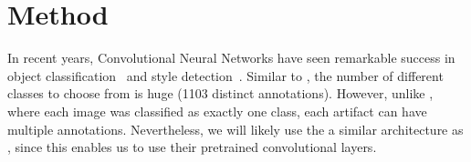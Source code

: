 \section{Method}
In recent years, Convolutional Neural Networks have seen remarkable success in object classification~\cite{alexnet} and style detection~\cite{style}.
Similar to \citet{alexnet}, the number of different classes to choose from is huge (1103 distinct annotations).
However, unlike \citeauthor{alexnet}, where each image was classified as exactly one class, each artifact can have multiple annotations.
Nevertheless, we will likely use the a similar architecture as \citeauthor{alexnet}, since this enables us to use their pretrained convolutional layers.